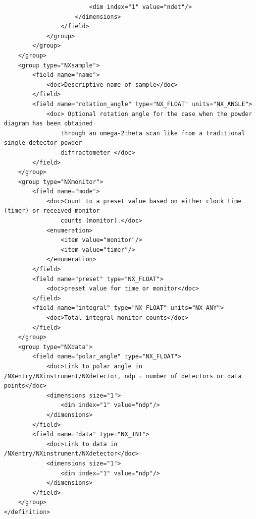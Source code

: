 \documentclass[a4paper]{article}\usepackage[dvips]{graphicx}
\begin{document}
\begin{verbatim}
                        <dim index="1" value="ndet"/>
                    </dimensions>
                </field>
            </group>
        </group>
    </group>
    <group type="NXsample">
        <field name="name">
            <doc>Descriptive name of sample</doc>
        </field>
        <field name="rotation_angle" type="NX_FLOAT" units="NX_ANGLE">
            <doc> Optional rotation angle for the case when the powder diagram has been obtained
                through an omega-2theta scan like from a traditional single detector powder
                diffractometer </doc>
        </field>
    </group>
    <group type="NXmonitor">
        <field name="mode">
            <doc>Count to a preset value based on either clock time (timer) or received monitor
                counts (monitor).</doc>
            <enumeration>
                <item value="monitor"/>
                <item value="timer"/>
            </enumeration>
        </field>
        <field name="preset" type="NX_FLOAT">
            <doc>preset value for time or monitor</doc>
        </field>
        <field name="integral" type="NX_FLOAT" units="NX_ANY">
            <doc>Total integral monitor counts</doc>
        </field>
    </group>
    <group type="NXdata">
        <field name="polar_angle" type="NX_FLOAT">
            <doc>Link to polar angle in /NXentry/NXinstrument/NXdetector, ndp = number of detectors or data points</doc>
            <dimensions size="1">
                <dim index="1" value="ndp"/>
            </dimensions>
        </field>
        <field name="data" type="NX_INT">
            <doc>Link to data in /NXentry/NXinstrument/NXdetector</doc>
            <dimensions size="1">
                <dim index="1" value="ndp"/>
            </dimensions>
        </field>
    </group>
</definition>

\end{verbatim}
  
\end{document}
